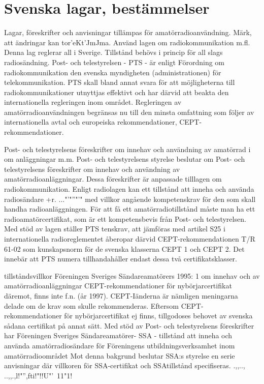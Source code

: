 \section{Svenska lagar, bestämmelser}

Lagar, föreskrifter och anvisningar
tillämpas för amatörradioanvändning.
Märk, att ändringar kan tor'eKt'JmJma.
Använd
lagen om radiokommunikation m.fl.
Denna lag reglerar all
i
Sverige. Tillstånd behövs i princip för all
slags radiosändning.
Post- och telestyrelsen - PTS - är enligt
Förordning om radiokommunikation den
svenska myndigheten (administrationen) för
telekommunikation. PTS skall bland annat
svara för att möjligheterna till radiokommunikationer utnyttjas effektivt och har därvid att
beakta den internationella regleringen inom
området. Regleringen av amatörradioanvändningen begränsas nu till den minsta
omfattning som följer av internationella avtal
och europeiska rekommendationer,
CEPT-rekommendationer.

Post- och telestyrelsens föreskrifter om
innehav och användning av amatörrad i om
anläggningar m.m.
Post- och telestyrelsens styrelse beslutar
om Post- och telestyrelsens föreskrifter om
innehav och användning av amatörradioanläggningar. Dessa föreskrifter är anpassade tilllagen om radiokommunikation.
Enligt radiolagen kan ett tillstånd att
inneha och använda radiosändare +r. ..."'"''"'"
med villkor angående kompetenskrav för
den som skall handha radioanläggningen.
För att få ett amatörradiotillstånd måste
man ha ett radioamatörcertifikat, som är ett
kompetensbevis från Post- och telestyrelsen. Med stöd av lagen ställer PTS
tenskrav, att jämföras med artikel S25 i
internationella radioreglementet
åberopar därvid CEPT-rekommendationen
T/R 61-02 som kunskapsnorm för de svenska klasserna CEPT 1 och CEPT 2.
Det innebär att PTS numera tillhandahåller endast dessa två certifikatsklasser.

tillståndsvillkor
Föreningen Sveriges Sändareamatörers
1995: 1 om innehav och
av amatörradioanläggningar
CEPT-rekommendationer för nybörjarcertifikat däremot, finns inte f.n. (år 1997).
CEPT-Iänderna är nämligen meningarna delade om de krav som skulle
rekommenderas. Eftersom CEPT-rekommendationer för nybörjarcertifikat ej finns,
tillgodoses behovet av svenska sådana certifikat på annat sätt.
Med stöd av Post- och telestyrelsens
föreskrifter har Föreningen Sveriges Sändareamatörer- SSA - tillstånd att inneha
och använda amatörradiosändare för Föreningens utbildningsverksamhet inom amatörradioområdet Mot denna bakgrund beslutar SSA:s styrelse en serie anvisningar
där villkoren för SSA-certifikat och SSAtillstånd specifiseras.
.,,.., ..,,.,l!"'',fti!"!!U"'\ 11"1!

